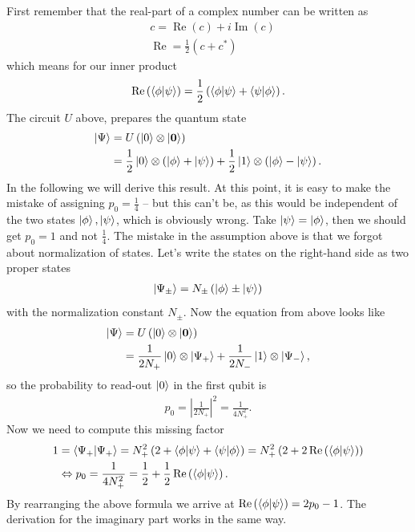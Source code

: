 First remember that the real-part of a complex number can be written as
\begin{align}
    &c = \operatorname{Re}(c) + i\operatorname{Im}(c)\\
    &\operatorname{Re} = \frac{1}{2}\left(c + c^*\right)
\end{align}
which means for our inner product
\begin{align}
    \operatorname{Re}\left(\braket{\phi}{\psi}\right) = \frac{1}{2}\left(\braket{\phi}{\psi} + \braket{\psi}{\phi}\right).
\end{align}
The circuit $U$ above, prepares the quantum state
\begin{align}
    \ket{\Psi} &= U\left(\ket{0}\otimes\ket{\boldsymbol{0}}\right) \\
    &= \frac{1}{2} \ket{0}\otimes\left(\ket{\phi} + \ket{\psi} \right) + \frac{1}{2} \ket{1}\otimes\left(\ket{\phi} - \ket{\psi} \right).
\end{align}
In the following we will derive this result.
At this point, it is easy to make the mistake of assigning $p_0 = \frac{1}{4}$ -- but this can't be, as this would be independent of the two states $\ket{\phi},\ket{\psi}$, which is obviously wrong. Take $\ket{\psi}=\ket{\phi}$, then we should get $p_0=1$ and not $\frac{1}{4}$. 
The mistake in the assumption above is that we forgot about normalization of states. Let's write the states on the right-hand side as two proper states
\begin{align}
    \ket{\Psi_\pm} = N_\pm \left(\ket{\phi} \pm \ket{\psi}\right)
\end{align}
with the normalization constant $N_\pm$. Now the equation from above looks like
\begin{align}
    \ket{\Psi} &= U\left(\ket{0}\otimes\ket{\boldsymbol{0}}\right) \\
    &= \frac{1}{{2N_+}} \ket{0}\otimes \ket{\Psi_+}+ \frac{1}{{2N_-}} \ket{1}\otimes\ket{\Psi_-},
\end{align}
so the probability to read-out $\ket{0}$ in the first qubit is
\begin{align}
    p_0 = |\frac{1}{2N_+}|^2 = \frac{1}{4N_+^2}.
\end{align}
Now we need to compute this missing factor
\begin{align}
    1 &= \braket{\Psi_+}{\Psi_+} = N_+^2 \left(2 + \braket{\phi}{\psi} + \braket{\psi}{\phi}\right) = N_+^2\left( 2 + 2\operatorname{Re}\left(\braket{\phi}{\psi}\right)\right)\nonumber\\
    &\Leftrightarrow  p_0 = \frac{1}{4N_+^2} = \frac{1}{2} +\frac{1}{2} \operatorname{Re}\left(\braket{\phi}{\psi}\right).
\end{align}
By rearranging the above formula we arrive at $\operatorname{Re}\left(\braket{\phi}{\psi}\right) = 2p_0 - 1$.
The derivation for the imaginary part works in the same way.

